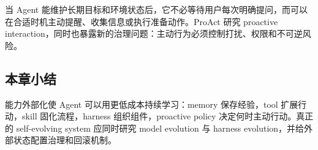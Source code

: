 当 Agent 能维护长期目标和环境状态后，它不必等待用户每次明确提问，而可以在合适时机主动提醒、收集信息或执行准备动作。ProAct 研究 proactive interaction，同时也暴露新的治理问题：主动行为必须控制打扰、权限和不可逆风险。



\subsection{本章小结}

能力外部化使 Agent 可以用更低成本持续学习：memory 保存经验，tool 扩展行动，skill 固化流程，harness 组织组件，proactive policy 决定何时主动行动。真正的 self-evolving system 应同时研究 model evolution 与 harness evolution，并给外部状态配置治理和回滚机制。
